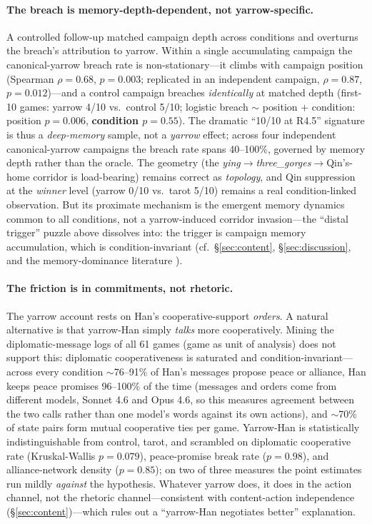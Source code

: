 \documentclass[11pt]{article}
\begin{document}
\paragraph{The breach is memory-depth-dependent, not yarrow-specific.} A controlled follow-up matched campaign depth across conditions and overturns the breach's attribution to yarrow. Within a single accumulating campaign the canonical-yarrow breach rate is non-stationary---it climbs with campaign position (Spearman $\rho = 0.68$, $p = 0.003$; replicated in an independent campaign, $\rho = 0.87$, $p = 0.012$)---and a control campaign breaches \emph{identically} at matched depth (first-10 games: yarrow 4/10 vs.\ control 5/10; logistic breach $\sim$ position $+$ condition: position $p = 0.006$, \textbf{condition $p = 0.55$}). The dramatic ``10/10 at R4.5'' signature is thus a \emph{deep-memory} sample, not a \emph{yarrow} effect; across four independent canonical-yarrow campaigns the breach rate spans 40--100\%, governed by memory depth rather than the oracle. The geometry (the \emph{ying}$\to$\emph{three\_gorges}$\to$Qin's-home corridor is load-bearing) remains correct as \emph{topology}, and Qin suppression at the \emph{winner} level (yarrow 0/10 vs.\ tarot 5/10) remains a real condition-linked observation. But its proximate mechanism is the emergent memory dynamics common to all conditions, not a yarrow-induced corridor invasion---the ``distal trigger'' puzzle above dissolves into: the trigger is campaign memory accumulation, which is condition-invariant (cf.\ \S\ref{sec:content}, \S\ref{sec:discussion}, and the memory-dominance literature \citealt{MemoryCurse2026}).

\paragraph{The friction is in commitments, not rhetoric.} The yarrow account rests on Han's cooperative-support \emph{orders}. A natural alternative is that yarrow-Han simply \emph{talks} more cooperatively. Mining the diplomatic-message logs of all 61 games (game as unit of analysis) does not support this: diplomatic cooperativeness is saturated and condition-invariant---across every condition $\sim$76--91\% of Han's messages propose peace or alliance, Han keeps peace promises 96--100\% of the time (messages and orders come from different models, Sonnet 4.6 and Opus 4.6, so this measures agreement between the two calls rather than one model's words against its own actions), and $\sim$70\% of state pairs form mutual cooperative ties per game. Yarrow-Han is statistically indistinguishable from control, tarot, and scrambled on diplomatic cooperative rate (Kruskal-Wallis $p = 0.079$), peace-promise break rate ($p = 0.98$), and alliance-network density ($p = 0.85$); on two of three measures the point estimates run mildly \emph{against} the hypothesis. Whatever yarrow does, it does in the action channel, not the rhetoric channel---consistent with content-action independence (\S\ref{sec:content})---which rules out a ``yarrow-Han negotiates better'' explanation.
\end{document}
